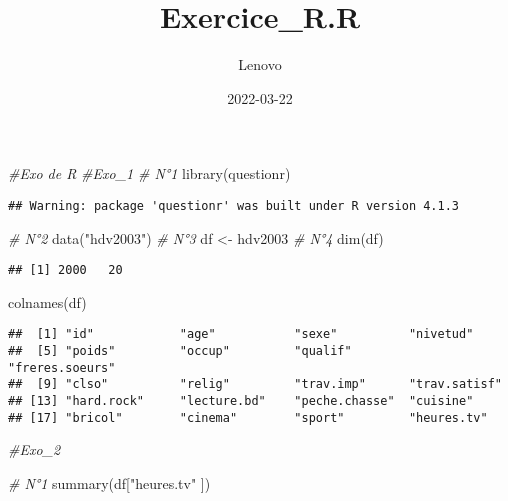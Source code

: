 \documentclass[
]{article}
\title{Exercice\_R.R}
\author{Lenovo}
\date{2022-03-22}
\newenvironment{Shaded}{\begin{snugshade}}{\end{snugshade}}
\newcommand{\CommentTok}[1]{\textcolor[rgb]{0.56,0.35,0.01}{\textit{#1}}}
\newcommand{\FunctionTok}[1]{\textcolor[rgb]{0.00,0.00,0.00}{#1}}
\newcommand{\NormalTok}[1]{#1}
\newcommand{\OtherTok}[1]{\textcolor[rgb]{0.56,0.35,0.01}{#1}}
\newcommand{\StringTok}[1]{\textcolor[rgb]{0.31,0.60,0.02}{#1}}
\begin{document}
\maketitle

\begin{Shaded}
\begin{Highlighting}[]
\CommentTok{\#Exo de R}
  \CommentTok{\#Exo\_1}
\CommentTok{\# N°1}
\FunctionTok{library}\NormalTok{(questionr)}
\end{Highlighting}
\end{Shaded}

\begin{verbatim}
## Warning: package 'questionr' was built under R version 4.1.3
\end{verbatim}

\begin{Shaded}
\begin{Highlighting}[]
\CommentTok{\# N°2}
\FunctionTok{data}\NormalTok{(}\StringTok{"hdv2003"}\NormalTok{)}
\CommentTok{\# N°3}
\NormalTok{df }\OtherTok{\textless{}{-}}\NormalTok{ hdv2003}
\CommentTok{\# N°4}
\FunctionTok{dim}\NormalTok{(df)}
\end{Highlighting}
\end{Shaded}

\begin{verbatim}
## [1] 2000   20
\end{verbatim}

\begin{Shaded}
\begin{Highlighting}[]
\FunctionTok{colnames}\NormalTok{(df)}
\end{Highlighting}
\end{Shaded}

\begin{verbatim}
##  [1] "id"            "age"           "sexe"          "nivetud"      
##  [5] "poids"         "occup"         "qualif"        "freres.soeurs"
##  [9] "clso"          "relig"         "trav.imp"      "trav.satisf"  
## [13] "hard.rock"     "lecture.bd"    "peche.chasse"  "cuisine"      
## [17] "bricol"        "cinema"        "sport"         "heures.tv"
\end{verbatim}

\begin{Shaded}
\begin{Highlighting}[]
  \CommentTok{\#Exo\_2}

\CommentTok{\# N°1}
\FunctionTok{summary}\NormalTok{(df[}\StringTok{"heures.tv"}\NormalTok{ ])}
\end{Highlighting}
\end{Shaded}
\end{document}
